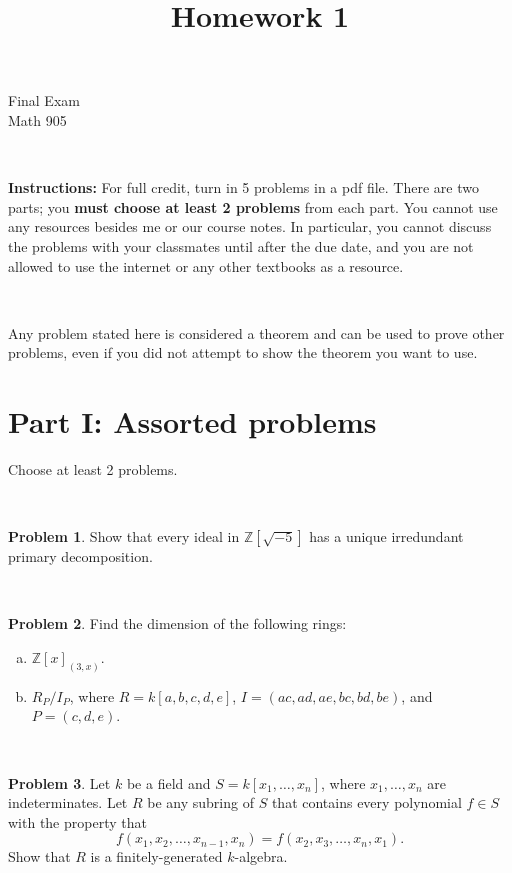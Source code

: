\documentclass[11pt]{article}
\title{}
\date{\vspace{-0.5in}}
\title{Homework 1}
\theoremstyle{definition}
\newtheorem{problem}{Problem}
\begin{document}
\thispagestyle{fancy}
\pagestyle{fancy}

\vspace{3em}

\begin{center}
	{\LARGE Final Exam} \\ Math 905
\end{center}

\

\noindent
{\bf Instructions:}
For full credit, turn in 5 problems in a pdf file. There are two parts; you {\bf must choose at least 2 problems} from each part.
You cannot use any resources besides me or our course notes. In particular, you cannot discuss the problems with your classmates until after the due date, and you are not allowed to use the internet or any other textbooks as a resource.

\

Any problem stated here is considered a theorem and can be used to prove other problems, even if you did not attempt to show the theorem you want to use.

\vspace{2em}

\section*{Part I: Assorted problems} 
Choose at least 2 problems.

\

\begin{problem}
	Show that every ideal in $\mathbb{Z}[\sqrt{-5}]$ has a unique irredundant primary decomposition.
\end{problem}

\

\begin{problem}
	Find the dimension of the following rings:
	
	\begin{enumerate}[a)]
		\item $\mathbb{Z}[x]_{(3,x)}$.
		\item $R_P/I_P$, where $R = k[a,b,c,d,e]$, $I=(ac,ad,ae,bc,bd,be)$, and $P=(c,d,e)$.
	\end{enumerate}
\end{problem}

\



\begin{problem}
	Let $k$ be a field and $S = k[x_1, \ldots, x_n]$, where $x_1, \ldots, x_n$ are indeterminates. Let $R$ be any subring of $S$ that contains every polynomial $f \in S$ with the property that
	$$f(x_1, x_2, \ldots, x_{n-1}, x_n) =f(x_2, x_3, \ldots, x_n, x_1).$$
	Show that $R$ is a finitely-generated $k$-algebra.
\end{problem}
\end{document}
